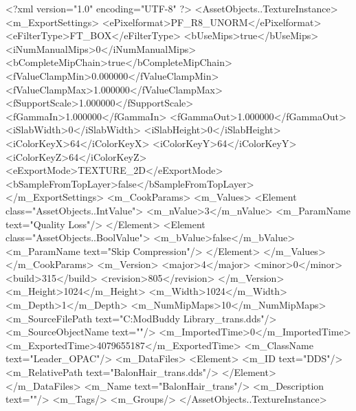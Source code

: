 <?xml version="1.0" encoding="UTF-8" ?>
<AssetObjects..TextureInstance>
	<m_ExportSettings>
		<ePixelformat>PF_R8_UNORM</ePixelformat>
		<eFilterType>FT_BOX</eFilterType>
		<bUseMips>true</bUseMips>
		<iNumManualMips>0</iNumManualMips>
		<bCompleteMipChain>true</bCompleteMipChain>
		<fValueClampMin>0.000000</fValueClampMin>
		<fValueClampMax>1.000000</fValueClampMax>
		<fSupportScale>1.000000</fSupportScale>
		<fGammaIn>1.000000</fGammaIn>
		<fGammaOut>1.000000</fGammaOut>
		<iSlabWidth>0</iSlabWidth>
		<iSlabHeight>0</iSlabHeight>
		<iColorKeyX>64</iColorKeyX>
		<iColorKeyY>64</iColorKeyY>
		<iColorKeyZ>64</iColorKeyZ>
		<eExportMode>TEXTURE_2D</eExportMode>
		<bSampleFromTopLayer>false</bSampleFromTopLayer>
	</m_ExportSettings>
	<m_CookParams>
		<m_Values>
			<Element class="AssetObjects..IntValue">
				<m_nValue>3</m_nValue>
				<m_ParamName text="Quality Loss"/>
			</Element>
			<Element class="AssetObjects..BoolValue">
				<m_bValue>false</m_bValue>
				<m_ParamName text="Skip Compression"/>
			</Element>
		</m_Values>
	</m_CookParams>
	<m_Version>
		<major>4</major>
		<minor>0</minor>
		<build>315</build>
		<revision>805</revision>
	</m_Version>
	<m_Height>1024</m_Height>
	<m_Width>1024</m_Width>
	<m_Depth>1</m_Depth>
	<m_NumMipMaps>10</m_NumMipMaps>
	<m_SourceFilePath text="C:\Users\Furion\Documents\Firaxis ModBuddy Library\BalonGreyjoy\BalonHair_trans.dds"/>
	<m_SourceObjectName text=""/>
	<m_ImportedTime>0</m_ImportedTime>
	<m_ExportedTime>4079655187</m_ExportedTime>
	<m_ClassName text="Leader_OPAC"/>
	<m_DataFiles>
		<Element>
			<m_ID text="DDS"/>
			<m_RelativePath text="BalonHair_trans.dds"/>
		</Element>
	</m_DataFiles>
	<m_Name text="BalonHair_trans"/>
	<m_Description text=""/>
	<m_Tags/>
	<m_Groups/>
</AssetObjects..TextureInstance>

